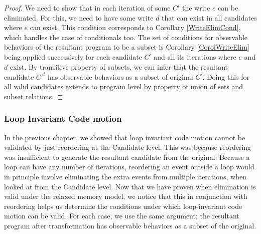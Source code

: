         \begin{proof}
            
            We need to show that in each iteration of some $C^i$ the write $e$ can be eliminated. 
            For this, we need to have some write $d$ that can exist in all candidates where $e$ can exist. 
            This condition corresponds to Corollary \ref{WriteElimCond}, which handles the case of conditionals too. 
            The set of conditions for observable behaviors of the resultant program to be a subset is Corollary \ref{CorolWriteElim} being applied successively for each candidate $C^i$ and all its iterations where $e$ and $d$ exist. 
            By transitive property of subsets, we can infer that the resultant candidate $C'^i$ has observable behaviors as a subset of original $C^i$. 
            Doing this for all valid candidates extends to program level by property of union of sets and subset relations\footnotemark.
    
                
        \end{proof}
         
        \subsubsection{Loop Invariant Code motion}  

            In the previous chapter, we showed that loop invariant code motion cannot be validated by just reordering at the Candidate level. 
            This was because reordering was insufficient to generate the resultant candidate from the original. 
            Because a loop can have any number of iterations, reordering an event outside a loop would in principle involve eliminating the extra events from multiple iterations, when looked at from the Candidate level. 
            Now that we have proven when elimination is valid under the relaxed memory model, we notice that this in conjunction with reordering helps us determine the conditions under which loop-invariant code motion can be valid.
            For each case, we use the same argument; the resultant program after transformation has observable behaviors as a subset of the original. 

